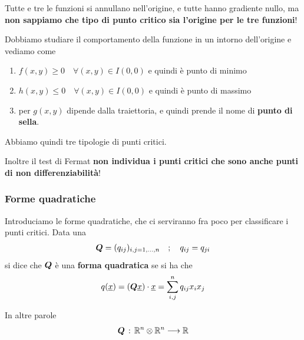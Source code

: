 Tutte e tre le funzioni si annullano nell'origine, e tutte hanno gradiente nullo, ma \textbf{non sappiamo che tipo di punto critico sia l'origine per le tre funzioni}!

Dobbiamo studiare il comportamento della funzione in un intorno dell'origine e vediamo come
\begin{enumerate}
	\item  $f(x,y)\geq 0 \quad \forall (x,y)\in I(0,0)$ e quindi è punto di minimo
	\item $h(x,y)\leq 0 \quad \forall (x,y)\in I(0,0)$ e quindi è punto di massimo
	\item per $g(x,y)$ dipende dalla traiettoria, e quindi prende il nome di \textbf{punto di sella}.
\end{enumerate}

Abbiamo quindi tre tipologie di punti critici. 

Inoltre il test di Fermat \textbf{non individua i punti critici che sono anche punti di non differenziabilità}!

\subsubsection{Forme quadratiche}

Introduciamo le forme quadratiche, che ci serviranno fra poco per classificare i punti critici.
Data una
\begin{align}
	\boldsymbol{Q} =(q_{ij})_{i,j=1,\dots,n} \quad ; \quad q_{ij}=q_{ji}
\end{align}
si dice che $\boldsymbol{Q}$ è una \textbf{forma quadratica} se si ha che
\begin{align}
	q(\underline{x})=(\boldsymbol{Q} \underline{x}) \cdot \underline{x} = \sum_{i,j}^{n} q_{ij}x_i x_j
\end{align}

In altre parole
\begin{align}
	\boldsymbol{Q} \, : \, \mathbb{R}^n \otimes \mathbb{R}^n \longrightarrow \mathbb{R}
\end{align}

\newpage

